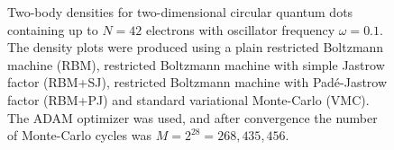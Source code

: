 \begin{landscape}
\begin{figure}[H]
		\hspace{0.1cm}
		
		\caption{Two-body densities for two-dimensional circular quantum dots containing up to $N=42$ electrons with oscillator frequency $\omega=0.1$. The density plots were produced using a plain restricted Boltzmann machine (RBM), restricted Boltzmann machine with simple Jastrow factor (RBM+SJ), restricted Boltzmann machine with Padé-Jastrow factor (RBM+PJ) and standard variational Monte-Carlo (VMC). The  ADAM optimizer was used, and after convergence the number of Monte-Carlo cycles was $M=2^{28}=268,435,456$.}%
		\label{fig:TB_2D_0p1w}
	\end{figure}
	

\end{landscape}
